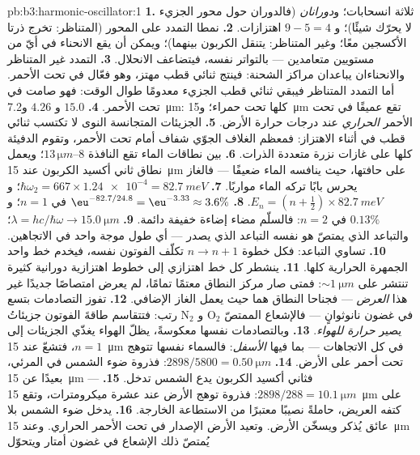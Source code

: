 \begin{solution}{pb:b3:harmonic-oscillator:1}
\textbf{1.} ثلاثة انسحابات؛ و\emph{دورانان} (فالدوران حول
محور الجزيء لا يحرّك شيئًا)؛ و $9 - 5 = 4$ اهتزازات.
\textbf{2.} نمطا التمدد على المحور (المتناظر: تخرج ذرتا الأكسجين
معًا؛ وغير المتناظر: يتنقل الكربون بينهما)؛ ويمكن أن يقع الانحناء
في أيّ من مستويين متعامدين --- بالتواتر نفسه، فيتضاعف
الانحلال.
\textbf{3.} التمدد غير المتناظر والانحناءان يباعدان مراكز
الشحنة: فينتج ثنائي قطب مهتز، وهو فعّال في تحت الأحمر. أما التمدد
المتناظر فيبقي ثنائي قطب الجزيء معدومًا طوال الوقت:
فهو صامت في تحت الأحمر.
\textbf{4.} $15.0$ و $4.26$ و\qty{7.2}{\micro m}: كلها تحت حمراء؛
و\qty{15}{\micro m} تقع عميقًا في تحت الأحمر \emph{الحراري} عند
درجات حرارة الأرض.
\textbf{5.} الجزيئات المتجانسة النوى لا تكتسب ثنائي قطب في أثناء
الاهتزاز: فمعظم الغلاف الجوّي شفاف أمام تحت الأحمر، وتقوم
الدفيئة كلها على غازات نزرة متعددة الذرات.
\textbf{6.} بين نطاقات الماء تقع النافذة $8$--$13\,\unit{\micro m}$؛
ويعمل نطاق ثاني أكسيد الكربون عند \qty{15}{\micro m} على حافتها،
حيث ينافسه الماء ضعيفًا --- فالغاز يحرس بابًا تركه الماء
مواربًا.
\textbf{7.} $\hbar\omega_2 = 667 \times \num{1.24e-4} =
\qty{82.7}{meV}$؛ و $E_n = (n + \tfrac12) \times \qty{82.7}{meV}$.
\textbf{8.} $\eu^{-82.7/24.8} = \eu^{-3.33} \approx 3.6\%$ في $n =
1$؛ و $0.13\%$ في $n = 2$: فالسلّم مضاء إضاءة خفيفة دائمة.
\textbf{9.} $\lambda = hc/\hbar\omega \to \qty{15.0}{\micro m}$؛
والتباعد الذي يمتصّ هو نفسه التباعد الذي يصدر --- أي طول موجة
واحد في الاتجاهين.
\textbf{10.} تساوي التباعد: فكل خطوة $n \to n + 1$ تكلّف الفوتون
نفسه، فيخدم خط واحد الجمهرة الحرارية كلها.
\textbf{11.} ينشطر كل خط اهتزازي إلى خطوط اهتزازية
دورانية كثيرة تنتشر على $\sim\qty{1}{\micro m}$:
فمتى صار مركز النطاق معتمًا تمامًا، لم يعرض امتصاصًا جديدًا غير هذا
\emph{العرض} --- فجناحا النطاق هما حيث يعمل الغاز الإضافي.
\textbf{12.} تفوز التصادمات بتسع رتب: فتتقاسم طاقةَ الفوتون
جزيئاتُ N$_2$ و O$_2$ في غضون نانوثوانٍ
--- فالإشعاع الممتصّ يصير \emph{حرارة للهواء}.
\textbf{13.} وبالتصادمات نفسها معكوسةً، يظلّ الهواء
يغذّي الجزيئات إلى $n = 1$، فتشعّ عند \qty{15}{\micro m} في
كل الاتجاهات --- بما فيها \emph{الأسفل}: فالسماء نفسها تتوهج
تحت أحمر على الأرض.
\textbf{14.} $2898/5800 = \qty{0.50}{\micro m}$: فذروة ضوء الشمس في
المرئي، بعيدًا عن \qty{15}{\micro m} --- فثاني أكسيد الكربون يدع
الشمس تدخل.
\textbf{15.} $2898/288 = \qty{10.1}{\micro m}$: فذروة توهج الأرض
عند عشرة ميكرومترات، وتقع \qty{15}{\micro m} على كتفه العريض،
حاملةً نصيبًا معتبرًا من الاستطاعة الخارجة.
\textbf{16.} يدخل ضوء الشمس بلا عائق يُذكر ويسخّن
الأرض. وتعيد الأرض الإصدار في تحت الأحمر الحراري. وعند
\qty{15}{\micro m} يُمتصّ ذلك الإشعاع في غضون أمتار ويتحوّل

\end{solution}
